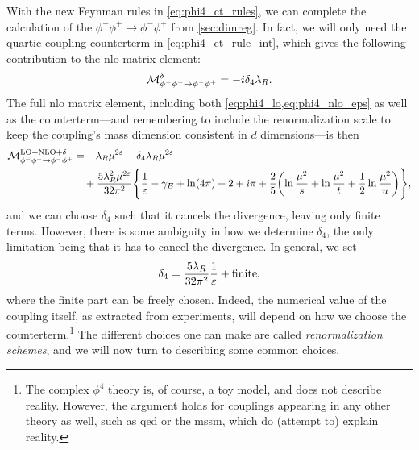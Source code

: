 With the new Feynman rules in \cref{eq:phi4_ct_rules}, we can complete the calculation of the $\phi^-\phi^+\to\phi^-\phi^+$ from \cref{sec:dimreg}.
In fact, we will only need the quartic coupling counterterm in \cref{eq:phi4_ct_rule_int}, which gives the following contribution to the \gls{nlo} matrix element:
\begin{equation}
    \mathcal{M}_{\phi^-\phi^+\to\phi^-\phi^+}^\delta = -i\delta_4 \lambda_R.
\end{equation}
The full \gls{nlo} matrix element, including both \cref{eq:phi4_lo,eq:phi4_nlo_eps} as well as the counterterm---and remembering to include the renormalization scale to keep the coupling's mass dimension consistent in $d$ dimensions---is then
\begin{equation}
\label{eq:phi4_nlo_ct}
\begin{split}
    \mathcal{M}_{\phi^-\phi^+\to\phi^-\phi^+}^{\mathrm{LO}+\mathrm{NLO}+\delta} &=
    -\lambda_R\mu^{2\varepsilon} - \delta_4 \lambda_R\mu^{2\varepsilon}
    \\ &\quad
    + \frac{5\lambda_R^2\mu^{2\varepsilon}}{32\pi^2} \Biggl\{
        \frac{1}{\varepsilon} - \gamma_E + \ln(4\pi) + 2 + i\pi + \frac{2}{5}\biggl(\ln\frac{\mu^2}{s} + \ln\frac{\mu^2}{t} + \frac{1}{2}\ln\frac{\mu^2}{u} \biggr)
    \Biggr\},
\end{split}
\end{equation}
and we can choose $\delta_4$ such that it cancels the divergence, leaving only finite terms.
However, there is some ambiguity in how we determine $\delta_4$, the only limitation being that it has to cancel the divergence.
In general, we set
\begin{equation}\label{eq:delta4_general}
    \delta_4 = \frac{5\lambda_R}{32\pi^2} \frac{1}{\varepsilon} + \text{finite},
\end{equation}
where the finite part can be freely chosen.
Indeed, the numerical value of the coupling itself, as extracted from experiments, will depend on how we choose the counterterm.\footnote{The complex $\phi^4$ theory is, of course, a toy model, and does not describe reality. However, the argument holds for couplings appearing in any other theory as well, such as \gls{qed} or the \gls{mssm}, which do (attempt to) explain reality.}
The different choices one can make are called \emph{renormalization schemes}, and we will now turn to describing some common choices.



